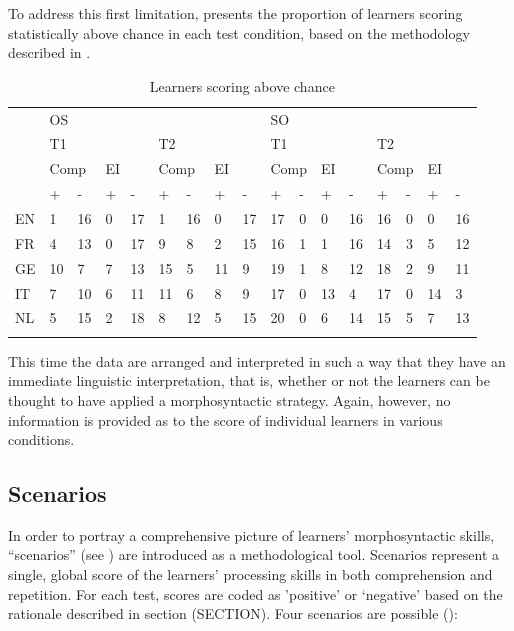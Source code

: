 To address this first limitation,  presents the proportion of learners scoring statistically above chance in each test condition, based on the methodology described in .

\begin{table}
    \begin{tabularx}{\textwidth}{XXXXXXXXXXXXXXXXX} & \multicolumn{8}{X}{ OS} & \multicolumn{8}{X}{ SO}\\
    \lsptoprule
    & \multicolumn{4}{X}{ T1} & \multicolumn{4}{X}{ T2} & \multicolumn{4}{X}{ T1} & \multicolumn{4}{X}{ T2}\\
    & \multicolumn{2}{X}{ Comp} & \multicolumn{2}{X}{ EI} & \multicolumn{2}{X}{ Comp} & \multicolumn{2}{X}{ EI} & \multicolumn{2}{X}{ Comp} & \multicolumn{2}{X}{ EI} & \multicolumn{2}{X}{ Comp} & \multicolumn{2}{X}{ EI}\\
    & + & {}- & + & {}- & + & {}- & + & {}- & + & {}- & + & {}- & + & {}- & + & {}-\\
    EN & 1 & 16 & 0 & 17 & 1 & 16 & 0 & 17 & 17 & 0 & 0 & 16 & 16 & 0 & 0 & 16\\
    FR & 4 & 13 & 0 & 17 & 9 & 8 & 2 & 15 & 16 & 1 & 1 & 16 & 14 & 3 & 5 & 12\\
    GE & 10 & 7 & 7 & 13 & 15 & 5 & 11 & 9 & 19 & 1 & 8 & 12 & 18 & 2 & 9 & 11\\
    IT & 7 & 10 & 6 & 11 & 11 & 6 & 8 & 9 & 17 & 0 & 13 & 4 & 17 & 0 & 14 & 3\\
    NL & 5 & 15 & 2 & 18 & 8 & 12 & 5 & 15 & 20 & 0 & 6 & 14 & 15 & 5 & 7 & 13\\
    \lspbottomrule
    \end{tabularx}
    \caption{Learners scoring above chance}
    \label{tab:06:1}
\end{table}

This time the data are arranged and interpreted in such a way that they have an immediate linguistic interpretation, that is, whether or not the learners can be thought to have applied a morphosyntactic strategy. Again, however, no information is provided as to the score of individual learners in various conditions.

\subsection{Scenarios}\label{sec:06:2.2}

In order to portray a comprehensive picture of learners’ morphosyntactic skills, “scenarios” (see ) are introduced as a methodological tool. Scenarios represent a single, global score of the learners' processing skills in both comprehension and repetition. For each test, scores are coded as 'positive' or ‘negative’ based on the rationale described in section (SECTION). Four scenarios are possible ():

